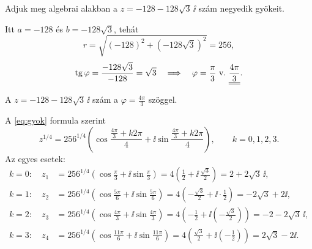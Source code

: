 \documentclass[11pt]{article}
\begin{document}
\begin{exbox}
\begin{example}
Adjuk meg algebrai alakban a $z=-128-128\sqrt{3}\,\ii$ szám negyedik gyökeit.
\end{example}
\end{exbox}
\begin{solution}
Itt $a=-128$ és $b=-128\sqrt{3}$, tehát
\[
r=\sqrt{(-128)^{2}+(-128\sqrt{3})^{2}}=256,
\]
\[
\operatorname{tg}\varphi=\frac{-128\sqrt{3}}{-128}=\sqrt{3}\quad\Longrightarrow\quad
\varphi=\frac{\pi}{3}\ \text{v.}\ \underline{\underline{\frac{4\pi}{3}}} .
\]

\begin{notefig}{A $z=-128-128\sqrt{3}\,\ii$ szám a $\varphi=\frac{4\pi}{3}$ szöggel.}
\end{notefig}

\noindent A \eqref{eq:gyok} formula szerint
\[
z^{1/4}=256^{1/4}\left(\cos\frac{\frac{4\pi}{3}+k2\pi}{4}+\ii\sin\frac{\frac{4\pi}{3}+k2\pi}{4}\right),
\qquad k=0, 1, 2, 3 .
\]
Az egyes esetek:
\begin{align*}
k=0:\quad z_{1}&=256^{1/4}\left(\cos\frac{\pi}{3}+\ii\sin\frac{\pi}{3}\right)
=4\left(\frac{1}{2}+\ii\,\frac{\sqrt{3}}{2}\right)=2+2\sqrt{3}\,\ii,\\
k=1:\quad z_{2}&=256^{1/4}\left(\cos\frac{5\pi}{6}+\ii\sin\frac{5\pi}{6}\right)
=4\left(-\frac{\sqrt{3}}{2}+\ii\cdot\frac{1}{2}\right)=-2\sqrt{3}+2\ii,\\
k=2:\quad z_{3}&=256^{1/4}\left(\cos\frac{4\pi}{3}+\ii\sin\frac{4\pi}{3}\right)
=4\left(-\frac{1}{2}+\ii\left(-\frac{\sqrt{3}}{2}\right)\right)=-2-2\sqrt{3}\,\ii,\\
k=3:\quad z_{4}&=256^{1/4}\left(\cos\frac{11\pi}{6}+\ii\sin\frac{11\pi}{6}\right)
=4\left(\frac{\sqrt{3}}{2}+\ii\left(-\frac{1}{2}\right)\right)=2\sqrt{3}-2\ii .
\end{align*}
\end{solution}
\end{document}
